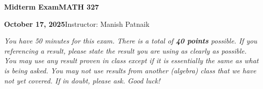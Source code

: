 \documentclass[11pt,reqno]{amsart}
\begin{document}
\begin{tcolorbox}[lecturebox,colback=lightblue,colframe=courseblue,
  boxrule=0pt,left=3mm,right=3mm,top=3mm,bottom=3mm]
  {\color{courseblue}\bfseries\Large Midterm Exam\hfill MATH 327}\par
  \smallskip
  \textbf{October 17, 2025}\hfill Instructor: Manish Patnaik
\end{tcolorbox}



\emph{You have 50 minutes for this exam. There is a total of \textbf{40 points} possible. If you referencing a result, please state the result you are using as clearly as possible. You may use any result proven in class except if it is essentially the same as what is being asked. You may not use results from another (algebra) class that we have not yet covered. If in doubt, please ask. Good luck! }  


\vspace{0.15in} 
\end{document}
